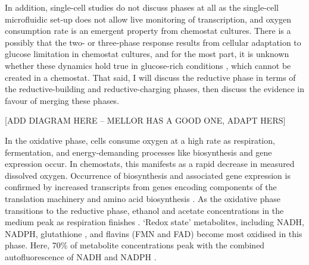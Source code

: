 In addition, single-cell studies \citep{papagiannakisAutonomousMetabolicOscillations2017, baumgartnerFlavinbasedMetabolicCycles2018} do not discuss phases at all as the single-cell microfluidic set-up does not allow live monitoring of transcription, and oxygen consumption rate is an emergent property from chemostat cultures.
There is a possibly that the two- or three-phase response results from cellular adaptation to glucose limitation in chemostat cultures, and for the most part, it is unknown whether these dynamics hold true in glucose-rich conditions \citep{slavovCouplingGrowthRate2011}, which cannot be created in a chemostat.
That said, I will discuss the reductive phase in terms of the reductive-building and reductive-charging phases, then discuss the evidence in favour of merging these phases.

[ADD DIAGRAM HERE -- MELLOR HAS A GOOD ONE, ADAPT HERS]

In the oxidative phase, cells consume oxygen at a high rate as respiration, fermentation, and
energy-demanding processes
like biosynthesis and gene expression occur.
In chemostats, this manifests as a rapid decrease in measured dissolved oxygen.
Occurrence of biosynthesis and associated gene expression is confirmed by increased transcripts from genes encoding components of the translation machinery and amino acid biosynthesis \parencite{tuLogicYeastMetabolic2005}.
As the oxidative phase transitions to the reductive phase, ethanol and acetate concentrations in the medium peak as respiration finishes \citep{tuLogicYeastMetabolic2005}.
`Redox state' metabolites, including NADH, NADPH, glutathione \citep{lloydUltradianMetronomeTimekeeper2005}, and flavins (FMN and FAD)
\parencite{murrayRedoxRegulationRespiring2011} become most oxidised in this phase.
Here, 70\% of metabolite concentrations peak with the combined autofluorescence of NADH and NADPH \citep{murrayRegulationYeastOscillatory2007}.

